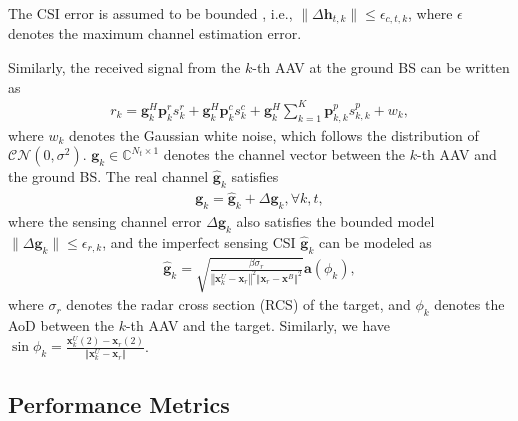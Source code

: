 \documentclass[twocolumn,journal]{IEEEtran}
\begin{document}
The CSI error is assumed to be bounded \cite{xuResource2025}, i.e., \(\|\Delta\boldsymbol{h}_{t,k}\| \leq \epsilon_{c,t,k}\), where \(\epsilon\) denotes the maximum channel estimation error. 

Similarly, the received signal from the \(k\)-th AAV at the ground BS can be written as 
\begin{align}
    r_k = \boldsymbol{g}^{H}_{k}\boldsymbol{p}^{r}_{k} {s}^{r}_{k} + \boldsymbol{g}^{H}_{k}\boldsymbol{p}^{c}_{k}{s}^{c}_{k} + \boldsymbol{g}^{H}_{k}\sum_{k=1}^{K} \boldsymbol{p}^{p}_{k,k} {s}^{p}_{k,k} + w_k,
\end{align}
where \(w_k\) denotes the Gaussian white noise, which follows the distribution of \(\mathcal{CN}(0,\sigma^2)\). \(\boldsymbol{g}_{k}\in\mathbb{C}^{N_t \times 1}\) denotes the channel vector between the \(k\)-th AAV and the ground BS. The real channel \(\hat{\boldsymbol{g}}_{k}\) satisfies
\begin{align}
     \boldsymbol{g}_{k} = \hat{\boldsymbol{g}}_{k} + \Delta\boldsymbol{g}_{k}, \forall k,t,\label{eq:sensingChannelUncertainty}
\end{align} 
where the sensing channel error \(\Delta\boldsymbol{g}_{k}\) also satisfies the bounded model \(\|\Delta\boldsymbol{g}_{k}\| \leq \epsilon_{r,k}\), and the imperfect sensing CSI \(\hat{\boldsymbol{g}}_{k}\) can be modeled as
\begin{align}
    \hat{\boldsymbol{g}}_{k} = \sqrt{\frac{\beta \sigma_r}{\left\Vert \boldsymbol{x}^{U}_{k} - \boldsymbol{x}_{r} \right\Vert^2 \left\Vert \boldsymbol{x}_{r} - \boldsymbol{x}^{B} \right\Vert^2}}\boldsymbol{a}(\phi_{k}),
\end{align}
where \(\sigma_r\) denotes the radar cross section (RCS) of the target, and \(\phi_{k}\) denotes the AoD between the \(k\)-th AAV and the target. Similarly, we have \(\sin\phi_{k} = \frac{\boldsymbol{x}^{U}_{k}(2) - \boldsymbol{x}_{r}(2)}{\Vert \boldsymbol{x}^{U}_{k} - \boldsymbol{x}_{r}\Vert}\).

\subsection{Performance Metrics}
\end{document}
